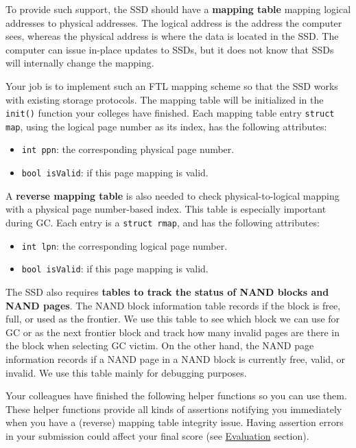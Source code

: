 \documentclass[11pt]{article}
\begin{document}
To provide such support, the SSD should have a \textbf{mapping table} mapping logical addresses to physical addresses. 
The logical address is the address the computer sees, whereas the physical address is where the data is located in the SSD. 
The computer can issue in-place updates to SSDs, but it does not know that SSDs will internally change the mapping.

Your job is to implement such an FTL mapping scheme so that the SSD works with existing storage protocols.
The mapping table will be initialized in the \texttt{init()} function your colleges have finished. Each mapping table entry \texttt{struct map}, using the logical page number as its index, has the following attributes:
\begin{itemize}
    \item \texttt{int ppn}: the corresponding physical page number.
    \item \texttt{bool isValid}: if this page mapping is valid.
\end{itemize}

A \textbf{reverse mapping table} is also needed to check physical-to-logical mapping with a physical page number-based index. This table is especially important during GC. Each entry is a \texttt{struct rmap}, and has the following attributes:

\begin{itemize}
    \item \texttt{int lpn}: the corresponding logical page number.
    \item \texttt{bool isValid}: if this page mapping is valid.
\end{itemize}

The SSD also requires \textbf{tables to track the status of NAND blocks and NAND pages}. 
The NAND block information table records if the block is free, full, or used as the frontier. 
We use this table to see which block we can use for GC or as the next frontier block and track how many invalid pages are there in the block when selecting GC victim.
On the other hand,
the NAND page information records if a NAND page in a NAND block is currently free, valid, or invalid. 
We use this table mainly for debugging purposes. 

Your colleagues have finished the following helper functions so you can use them.
These helper functions provide all kinds of assertions notifying you immediately when you have a (reverse) mapping table integrity issue. Having assertion errors in your submission could affect your final score (see \hyperref[sec:eval]{Evaluation} section).
\end{document}
